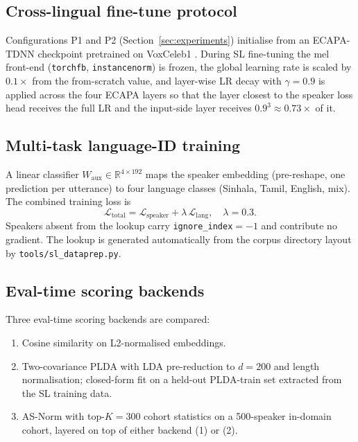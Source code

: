 \documentclass[11pt,a4paper]{article}
\begin{document}
\subsection{Cross-lingual fine-tune protocol}
\label{sec:method:finetune}

Configurations P1 and P2 (Section~\ref{sec:experiments}) initialise
from an ECAPA-TDNN checkpoint pretrained on VoxCeleb1
\cite{nagrani2017voxceleb}. During SL fine-tuning the mel front-end
(\texttt{torchfb}, \texttt{instancenorm}) is frozen, the global
learning rate is scaled by $0.1\times$ from the from-scratch value,
and layer-wise LR decay with $\gamma=0.9$ is applied across the
four ECAPA layers so that the layer closest to the speaker loss head
receives the full LR and the input-side layer receives
$0.9^3 \approx 0.73\times$ of it.

\subsection{Multi-task language-ID training}
\label{sec:method:langaux}

A linear classifier $W_{\mathrm{aux}}\in\mathbb{R}^{4\times 192}$
maps the speaker embedding (pre-reshape, one prediction per utterance)
to four language classes (Sinhala, Tamil, English, mix). The combined
training loss is
\begin{equation}
\mathcal{L}_{\mathrm{total}}
= \mathcal{L}_{\mathrm{speaker}}
+ \lambda \, \mathcal{L}_{\mathrm{lang}},
\quad \lambda = 0.3.
\end{equation}
Speakers absent from the lookup carry \texttt{ignore\_index}$=-1$ and
contribute no gradient. The lookup is generated automatically from
the corpus directory layout by \texttt{tools/sl\_dataprep.py}.

\subsection{Eval-time scoring backends}
\label{sec:method:scoring}

Three eval-time scoring backends are compared:
\begin{enumerate}
    \item Cosine similarity on L2-normalised embeddings.
    \item Two-covariance PLDA \cite{sizov2014unifying} with LDA
    pre-reduction to $d=200$ and length normalisation; closed-form
    fit on a held-out PLDA-train set extracted from the SL training
    data.
    \item AS-Norm \cite{matejka2017analysis} with top-$K=300$ cohort
    statistics on a 500-speaker in-domain cohort, layered on top of
    either backend (1) or (2).
\end{enumerate}
\end{document}
